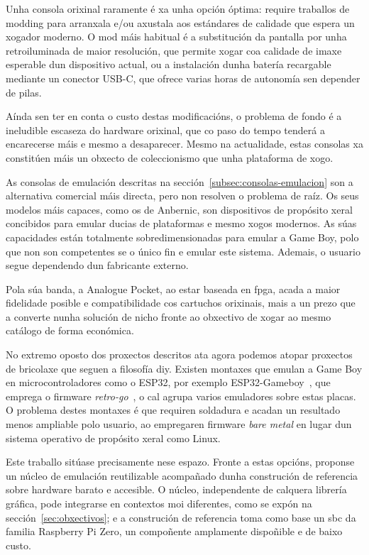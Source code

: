 Unha consola orixinal raramente é xa unha opción óptima:
require traballos de \gls{modding} para arranxala e/ou axustala aos estándares de calidade
que espera un xogador moderno.
O mod máis habitual é a substitución da pantalla por unha retroiluminada de maior resolución,
que permite xogar coa calidade de imaxe esperable dun dispositivo actual,
ou a instalación dunha batería recargable mediante un conector USB-C,
que ofrece varias horas de autonomía sen depender de pilas.

Aínda sen ter en conta o custo destas modificacións, o problema de fondo é a ineludible
escaseza do hardware orixinal, que co paso do tempo tenderá a encarecerse máis e mesmo a
desaparecer. Mesmo na actualidade, estas consolas xa constitúen máis un obxecto
de coleccionismo que unha plataforma de xogo.

As consolas de emulación descritas na sección~\ref{subsec:consolas-emulacion}
son a alternativa comercial máis directa, pero non resolven o problema de raíz.
Os seus modelos máis capaces, como os de Anbernic, son dispositivos de propósito xeral
concibidos para emular ducias de plataformas e mesmo xogos modernos.
As súas capacidades están totalmente sobredimensionadas para emular a Game Boy,
polo que non son competentes se o único fin e emular este sistema.
Ademais, o usuario segue dependendo dun fabricante externo.

Pola súa banda, a Analogue Pocket, ao estar baseada en \acrshort{fpga}, 
acada a maior fidelidade posible e compatibilidade cos cartuchos orixinais,
mais a un prezo que a converte nunha solución de nicho
fronte ao obxectivo de xogar ao mesmo catálogo de forma económica.


No extremo oposto dos proxectos descritos ata agora podemos atopar proxectos de bricolaxe
que seguen a filosofía \acrshort{diy}.
Existen montaxes que emulan a Game Boy en microcontroladores como o ESP32,
por exemplo ESP32-Gameboy~\cite{Esp32Gameboy}, que emprega o firmware \textit{retro-go}~\cite{RetroGo},
o cal agrupa varios emuladores sobre estas placas. O problema destes montaxes
é que requiren soldadura e acadan un resultado menos ampliable polo usuario, ao empregaren
firmware \textit{bare metal} en lugar dun sistema operativo de propósito xeral como Linux.


Este traballo sitúase precisamente nese espazo.
Fronte a estas opcións, proponse un núcleo de emulación reutilizable
acompañado dunha construción de referencia sobre hardware barato e accesible.
O núcleo, independente de calquera librería gráfica,
pode integrarse en contextos moi diferentes, como se expón na sección~\ref{sec:obxectivos};
e a construción de referencia toma como base un \acrfull{sbc} da familia Raspberry Pi Zero,
un compoñente amplamente dispoñible e de baixo custo.


